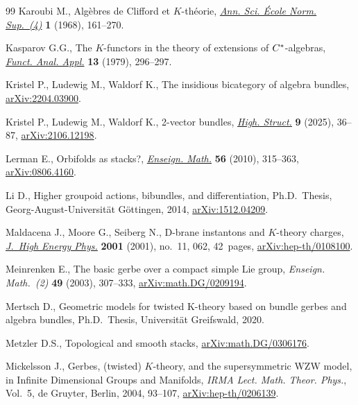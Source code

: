 \documentclass[10pt,a4paper]{amsart}
\numberwithin{equation}{section}
\begin{document}
\begin{thebibliography}{99}
Karoubi M., Alg\`ebres de {C}lifford et {$K$}-th\'eorie,
 \href{https://doi.org/10.24033/asens.1163}{\textit{Ann. Sci. \'{E}cole Norm.
 Sup.~(4)}} \textbf{1} (1968), 161--270.

Kasparov G.G., The {$K$}-functors in the theory of extensions of {$C\sp{\ast}
 $}-algebras, \href{https://doi.org/10.1007/BF01078376}{\textit{Funct. Anal.
 Appl.}} \textbf{13} (1979), 296--297.

Kristel P., Ludewig M., Waldorf K., The insidious bicategory of algebra
 bundles, \href{http://arxiv.org/abs/2204.03900}{arXiv:2204.03900}.

Kristel P., Ludewig M., Waldorf K., 2-vector bundles,
 \href{https://doi.org/10.21136/HS.2025.02}{\textit{High. Struct.}} \textbf{9}
 (2025), 36--87, \href{http://arxiv.org/abs/2106.12198}{arXiv:2106.12198}.

Lerman E., Orbifolds as stacks?,
 \href{https://doi.org/10.4171/LEM/56-3-4}{\textit{Enseign. Math.}}
 \textbf{56} (2010), 315--363,
 \href{http://arxiv.org/abs/0806.4160}{arXiv:0806.4160}.

Li D., Higher groupoid actions, bibundles, and differentiation, Ph.D.~Thesis,
 {G}eorg-{A}ugust-{U}niversit\"at G\"ottingen, 2014,
 \href{http://arxiv.org/abs/1512.04209}{arXiv:1512.04209}.

Maldacena J., Moore G., Seiberg N., D-brane instantons and {$K$}-theory
 charges, \href{https://doi.org/10.1088/1126-6708/2001/11/062}{\textit{J.~High
 Energy Phys.}} \textbf{2001} (2001), no.~11, 062, 42~pages,
 \href{http://arxiv.org/abs/hep-th/0108100}{arXiv:hep-th/0108100}.

Meinrenken E., The basic gerbe over a compact simple {L}ie group,
 \textit{Enseign. Math.~(2)} \textbf{49} (2003), 307--333,
 \href{http://arxiv.org/abs/math.DG/0209194}{arXiv:math.DG/0209194}.

Mertsch D., Geometric models for twisted {K}-theory based on bundle gerbes and
 algebra bundles, Ph.D.~Thesis, {U}niversit\"at Greifswald, 2020.

Metzler D.S., Topological and smooth stacks,
 \href{http://arxiv.org/abs/math.DG/0306176}{arXiv:math.DG/0306176}.

Mickelsson J., Gerbes, (twisted) {$K$}-theory, and the supersymmetric {WZW}
 model, in Infinite {D}imensional {G}roups and {M}anifolds, \textit{IRMA Lect.
 Math. Theor. Phys.}, Vol.~5, de Gruyter, Berlin, 2004, 93--107,
 \href{http://arxiv.org/abs/hep-th/0206139}{arXiv:hep-th/0206139}.


\end{thebibliography}
\end{document}
